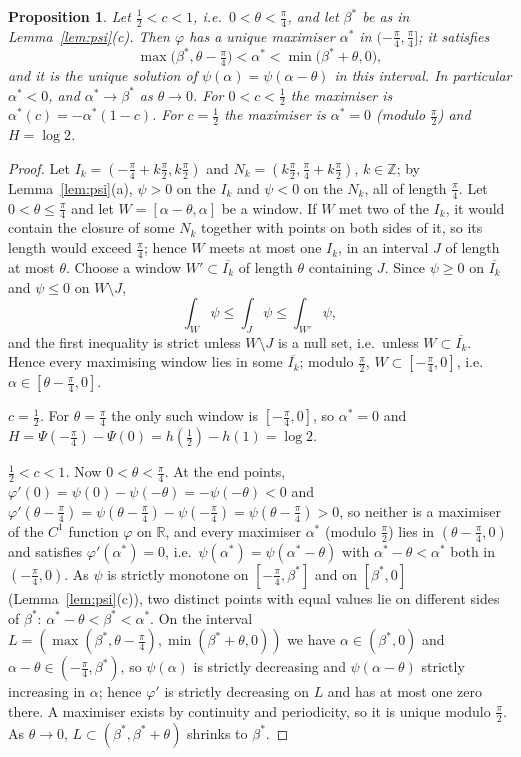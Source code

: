 \documentclass[11pt]{article}
\newcommand{\R}{\mathbb{R}}
\newcommand{\Z}{\mathbb{Z}}
\theoremstyle{plain}
\newtheorem{proposition}[theorem]{Proposition}
\theoremstyle{definition}
\theoremstyle{remark}
\begin{document}
\begin{proposition}\label{prop:angle}
Let $\frac12<c<1$, i.e.\ $0<\theta<\frac\pi4$, and let $\beta^*$ be as in Lemma~\ref{lem:psi}(c). Then $\varphi$ has a unique
maximiser $\alpha^*$ in $(-\frac\pi4,\frac\pi4]$; it satisfies
\[
  \max\bigl(\beta^*,\theta-\tfrac\pi4\bigr)<\alpha^*<\min\bigl(\beta^*+\theta,0\bigr),
\]
and it is the unique solution of $\psi(\alpha)=\psi(\alpha-\theta)$ in this interval. In particular $\alpha^*<0$, and
$\alpha^*\to\beta^*$ as $\theta\to0$. For $0<c<\frac12$ the maximiser is $\alpha^*(c)=-\alpha^*(1-c)$. For $c=\frac12$ the
maximiser is $\alpha^*=0$ (modulo $\frac\pi2$) and $H=\log2$.
\end{proposition}
\begin{proof}
Let $I_k=(-\frac\pi4+k\frac\pi2,k\frac\pi2)$ and $N_k=(k\frac\pi2,\frac\pi4+k\frac\pi2)$, $k\in\Z$; by Lemma~\ref{lem:psi}(a), $\psi>0$
on the $I_k$ and $\psi<0$ on the $N_k$, all of length $\frac\pi4$. Let $0<\theta\le\frac\pi4$ and let $W=[\alpha-\theta,\alpha]$ be a window. If
$W$ met two of the $I_k$, it would contain the closure of some $N_k$ together with points on both sides of it, so its length
would exceed $\frac\pi4$; hence $W$ meets at most one $I_k$, in an interval $J$ of length at most $\theta$. Choose a window $W'\subset\overline{I_k}$ of length $\theta$
containing $J$. Since $\psi\ge0$ on $\overline{I_k}$ and $\psi\le0$ on $W\setminus J$,
\[
  \int_W\psi\le\int_J\psi\le\int_{W'}\psi,
\]
and the first inequality is strict unless $W\setminus J$ is a null set, i.e.\ unless $W\subset\overline{I_k}$. Hence every
maximising window lies in some $\overline{I_k}$; modulo $\frac\pi2$, $W\subset[-\frac\pi4,0]$, i.e.\ $\alpha\in[\theta-\frac\pi4,0]$.

\emph{$c=\frac12$.} For $\theta=\frac\pi4$ the only such window is $[-\frac\pi4,0]$, so $\alpha^*=0$ and
$H=\Psi(-\frac\pi4)-\Psi(0)=h(\frac12)-h(1)=\log2$.

\emph{$\frac12<c<1$.} Now $0<\theta<\frac\pi4$. At the end points, $\varphi'(0)=\psi(0)-\psi(-\theta)=-\psi(-\theta)<0$ and
$\varphi'(\theta-\frac\pi4)=\psi(\theta-\frac\pi4)-\psi(-\frac\pi4)=\psi(\theta-\frac\pi4)>0$, so neither is a maximiser of the
$C^1$ function $\varphi$ on $\R$, and every maximiser $\alpha^*$ (modulo $\frac\pi2$) lies in $(\theta-\frac\pi4,0)$ and satisfies
$\varphi'(\alpha^*)=0$, i.e.\ $\psi(\alpha^*)=\psi(\alpha^*-\theta)$ with $\alpha^*-\theta<\alpha^*$ both in $(-\frac\pi4,0)$. As $\psi$ is
strictly monotone on $[-\frac\pi4,\beta^*]$ and on $[\beta^*,0]$ (Lemma~\ref{lem:psi}(c)), two distinct points with equal values lie
on different sides of $\beta^*$: $\alpha^*-\theta<\beta^*<\alpha^*$. On the interval $L=(\max(\beta^*,\theta-\frac\pi4),
\min(\beta^*+\theta,0))$ we have $\alpha\in(\beta^*,0)$ and $\alpha-\theta\in(-\frac\pi4,\beta^*)$, so $\psi(\alpha)$ is strictly
decreasing and $\psi(\alpha-\theta)$ strictly increasing in $\alpha$; hence $\varphi'$ is strictly decreasing on $L$ and has at most
one zero there. A maximiser exists by continuity and periodicity, so it is unique modulo $\frac\pi2$. As $\theta\to0$,
$L\subset(\beta^*,\beta^*+\theta)$ shrinks to $\beta^*$.


\end{proof}
\end{document}
